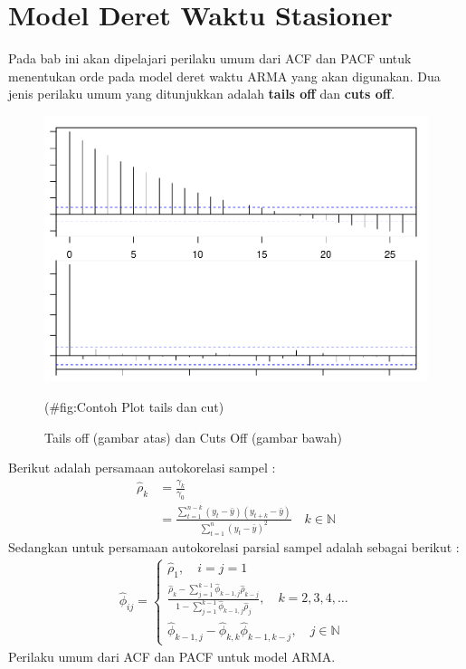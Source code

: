 \documentclass[
]{book}
\begin{document}
\hypertarget{model-deret-waktu-stasioner}{%
\chapter{Model Deret Waktu Stasioner}\label{model-deret-waktu-stasioner}}

Pada bab ini akan dipelajari perilaku umum dari ACF dan PACF untuk menentukan orde pada model deret waktu ARMA yang akan digunakan. Dua jenis perilaku umum yang ditunjukkan adalah \textbf{tails off} dan \textbf{cuts off}.\\

\begin{figure}

{\centering \includegraphics{_main_files/figure-latex/Contoh Plot tails dan cut-1} 

}

\caption{Tails off (gambar atas) dan Cuts Off (gambar bawah)}(\#fig:Contoh Plot tails dan cut)
\end{figure}

Berikut adalah persamaan autokorelasi sampel :
\begin{align*}
\hat{\rho}_k &= \frac{\gamma_k}{\gamma_0} \\
&= \frac{\sum_{t=1}^{n-k}(y_t - \bar{y})(y_{t+k} - \bar{y})}{\sum_{t=1}^n(y_t - \bar{y})^2} \quad k \in \mathbb{N}
\end{align*}
Sedangkan untuk persamaan autokorelasi parsial sampel adalah sebagai berikut :\\
\begin{align*}
\hat{\phi}_{ij} = \begin{cases}
\hat{\rho}_1, \quad i = j = 1 \\
\frac{\hat{\rho}_k - \sum_{j=1}^{k-1} \hat{\phi}_{k-1,j}\hat{\rho}_{k-j}}{1- \sum_{j=1}^{k-1} \hat{\phi}_{k-1,j}\hat{\rho}_{j}}, \quad k = 2,3,4,\dots \\
\hat{\phi}_{k-1,j} - \hat{\phi}_{k,k}\hat{\phi}_{k-1,k-j}, \quad j \in \mathbb{N}
\end{cases}
\end{align*}
Perilaku umum dari ACF dan PACF untuk model ARMA.
\end{document}
